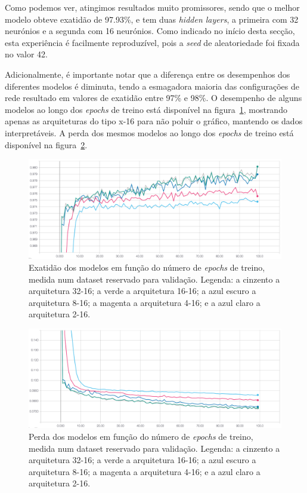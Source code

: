\documentclass[]{article}
\begin{document}
Como podemos ver, atingimos resultados muito promissores, sendo que o melhor modelo obteve exatidão de 97.93\%, e tem duas \textit{hidden layers}, a primeira com 32 neurónios e a segunda com 16 neurónios. Como indicado no início desta secção, esta experiência é facilmente reproduzível, pois a \textit{seed} de aleatoriedade foi fixada no valor 42.

Adicionalmente, é importante notar que a diferença entre os desempenhos dos diferentes modelos é diminuta, tendo a esmagadora maioria das configurações de rede resultado em valores de exatidão entre 97\% e 98\%. O desempenho de alguns modelos ao longo dos \textit{epochs} de treino está disponível na figura~\ref{fig:acc_grid_search_layers_size}, mostrando apenas as arquiteturas do tipo x-16 para não poluir o gráfico, mantendo os dados interpretáveis. A perda dos mesmos modelos ao longo dos \textit{epochs} de treino está disponível na figura~\ref{fig:loss_grid_search_layers_size}.

\begin{figure}[h!]
\centering
\includegraphics[scale=0.35]{img/acc_grid_search_selected_models.png}
\caption{Exatidão dos modelos em função do número de \textit{epochs} de treino, medida num dataset reservado para validação. Legenda: a cinzento a arquitetura 32-16; a verde a arquitetura 16-16; a azul escuro a arquitetura 8-16; a magenta a arquitetura 4-16; e a azul claro a arquitetura 2-16.}
\label{fig:acc_grid_search_layers_size}
\end{figure}

\begin{figure}[h!]
\centering
\includegraphics[scale=0.35]{img/loss_grid_search_selected_models.png}
\caption{Perda dos modelos em função do número de \textit{epochs} de treino, medida num dataset reservado para validação. Legenda: a cinzento a arquitetura 32-16; a verde a arquitetura 16-16; a azul escuro a arquitetura 8-16; a magenta a arquitetura 4-16; e a azul claro a arquitetura 2-16.}
\label{fig:loss_grid_search_layers_size}
\end{figure}
\end{document}

